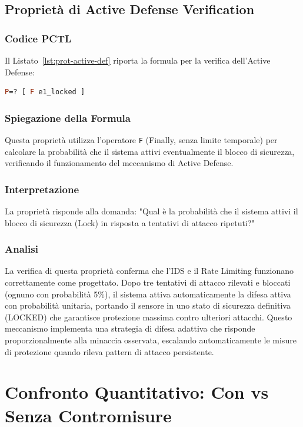 \subsection{Proprietà di Active Defense Verification}

\subsubsection{Codice PCTL}
Il Listato~\ref{lst:prot-active-def} riporta la formula per la verifica dell'Active Defense:
\begin{lstlisting}[style=mystyle, language=Prolog, caption={Verifica Active Defense}, label=lst:prot-active-def]
P=? [ F e1_locked ]
\end{lstlisting}

\subsubsection{Spiegazione della Formula}
Questa proprietà utilizza l'operatore \texttt{F} (Finally, senza limite temporale) per calcolare la probabilità che il sistema attivi eventualmente il blocco di sicurezza, verificando il funzionamento del meccanismo di Active Defense.

\subsubsection{Interpretazione}
La proprietà risponde alla domanda: "Qual è la probabilità che il sistema attivi il blocco di sicurezza (Lock) in risposta a tentativi di attacco ripetuti?"

\subsubsection{Analisi}
La verifica di questa proprietà conferma che l'IDS e il Rate Limiting funzionano correttamente come progettato. Dopo tre tentativi di attacco rilevati e bloccati (ognuno con probabilità 5\%), il sistema attiva automaticamente la difesa attiva con probabilità unitaria, portando il sensore in uno stato di sicurezza definitiva (LOCKED) che garantisce protezione massima contro ulteriori attacchi. Questo meccanismo implementa una strategia di difesa adattiva che risponde proporzionalmente alla minaccia osservata, escalando automaticamente le misure di protezione quando rileva pattern di attacco persistente.

\section{Confronto Quantitativo: Con vs Senza Contromisure}

